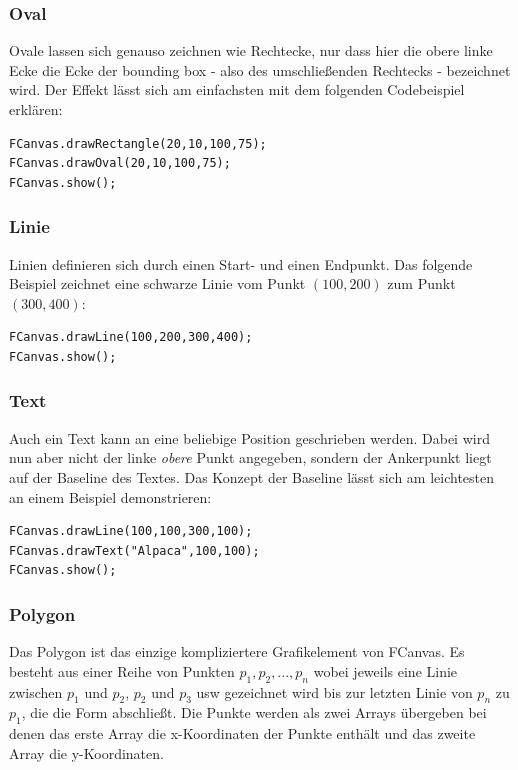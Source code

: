 \documentclass{article}
\renewcommand{\emph}[1]{\textit{#1}}
\newcommand{\enquote}[1]{\glqq{}#1\grqq{}}
\begin{document}
\subsubsection{Oval}
Ovale lassen sich genauso zeichnen wie Rechtecke, nur dass hier die \enquote{obere linke Ecke} die Ecke der \enquote{bounding box} - also des umschließenden Rechtecks - bezeichnet wird. Der Effekt lässt sich am einfachsten mit dem folgenden Codebeispiel erklären:

\begin{lstlisting}
FCanvas.drawRectangle(20,10,100,75);
FCanvas.drawOval(20,10,100,75);
FCanvas.show();
\end{lstlisting}

\subsubsection{Linie}
Linien definieren sich durch einen Start- und einen Endpunkt. Das folgende Beispiel zeichnet eine schwarze Linie vom Punkt $(100,200)$ zum Punkt $(300,400)$:

\begin{lstlisting}
FCanvas.drawLine(100,200,300,400);
FCanvas.show();
\end{lstlisting}

\subsubsection{Text}
Auch ein Text kann an eine beliebige Position geschrieben werden. Dabei wird nun aber nicht der linke \emph{obere} Punkt angegeben, sondern der Ankerpunkt liegt auf der \enquote{Baseline} des Textes. Das Konzept der Baseline lässt sich am leichtesten an einem Beispiel demonstrieren:

\begin{lstlisting}
FCanvas.drawLine(100,100,300,100);
FCanvas.drawText("Alpaca",100,100);
FCanvas.show();
\end{lstlisting}


\subsubsection{Polygon}
Das Polygon ist das einzige kompliziertere Grafikelement von FCanvas. Es besteht aus einer Reihe von Punkten $p_1,p_2, ... , p_n$ wobei jeweils eine Linie zwischen $p_1$ und $p_2$, $p_2$ und $p_3$ usw gezeichnet wird bis zur letzten Linie von $p_n$ zu $p_1$, die die Form abschließt. Die Punkte werden als zwei Arrays übergeben bei denen das erste Array die x-Koordinaten der Punkte enthält und das zweite Array die y-Koordinaten.
\end{document}
